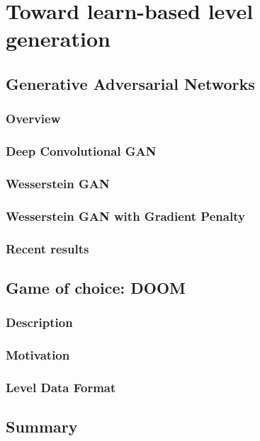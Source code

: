 \chapter{Toward learn-based level generation}
\section{Generative Adversarial Networks}
\subsection{Overview}
\subsection{Deep Convolutional GAN}
\subsection{Wesserstein GAN}
\subsection{Wesserstein GAN with Gradient Penalty}
\subsection{Recent results}

\section{Game of choice: DOOM}
\subsection{Description}
\subsection{Motivation}
\subsection{Level Data Format}

\section{Summary}

